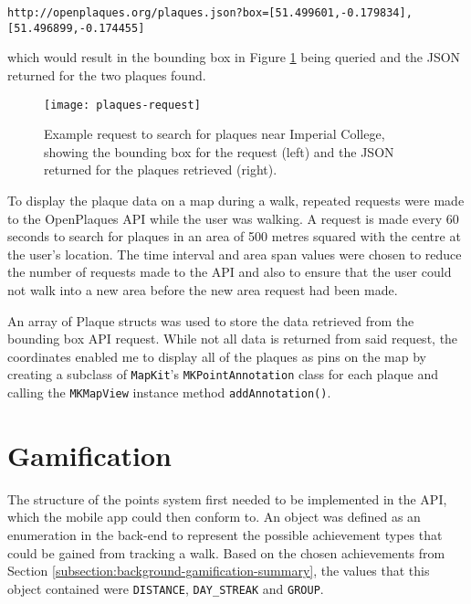 \vspace{-0.5cm}
\begin{center}
  \verb|http://openplaques.org/plaques.json?box=[51.499601,-0.179834],[51.496899,-0.174455]|
\end{center}

\noindent which would result in the bounding box in Figure \ref{fig:plaques-request} being queried and the JSON returned for the two plaques found.

\begin{figure}[hbt]
  \centering
  \texttt{[image: plaques-request]}
  \caption{Example request to search for plaques near Imperial College, showing the bounding box for the request (left) and the JSON returned for the plaques retrieved (right).}
  \label{fig:plaques-request}
\end{figure}


To display the plaque data on a map during a walk, repeated requests were made to the OpenPlaques API while the user was walking. A request is made every 60 seconds to search for plaques in an area of 500 metres squared with the centre at the user's location. The time interval and area span values were chosen to reduce the number of requests made to the API and also to ensure that the user could not walk into a new area before the new area request had been made.

An array of Plaque structs was used to store the data retrieved from the bounding box API request. While not all data is returned from said request, the coordinates enabled me to display all of the plaques as pins on the map by creating a subclass of \verb|MapKit|'s \verb|MKPointAnnotation| class for each plaque and calling the \verb|MKMapView| instance method \verb|addAnnotation()|.


\section{Gamification} \label{subsection:implementation-gamification}

The structure of the points system first needed to be implemented in the API, which the mobile app could then conform to. An object was defined as an enumeration in the back-end to represent the possible achievement types that could be gained from tracking a walk. Based on the chosen achievements from Section \ref{subsection:background-gamification-summary}, the values that this object contained were \verb|DISTANCE|, \verb|DAY_STREAK| and \verb|GROUP|.

